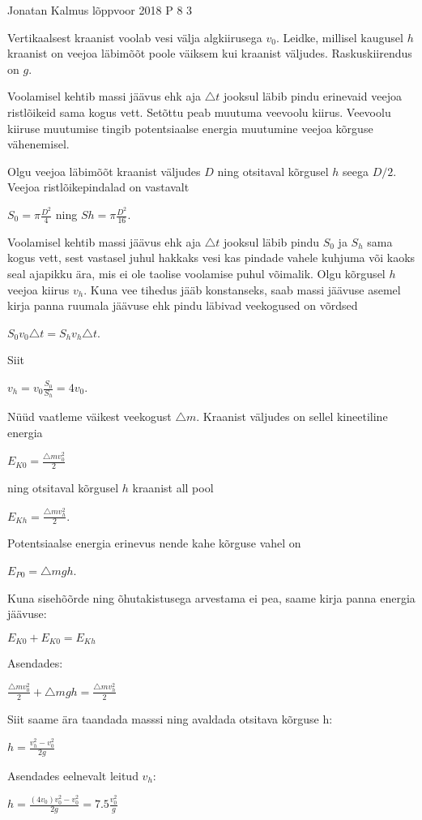 {Jonatan Kalmus} %
{lõppvoor} %
{2018} %
{P 8} %
{3} %
{

\ifStatement
Vertikaalsest kraanist voolab vesi välja algkiirusega $v_0$. Leidke, millisel kaugusel $h$ kraanist on veejoa läbimõõt poole väiksem kui kraanist väljudes. Raskuskiirendus on $g$.
\fi


\ifHint
Voolamisel kehtib massi jäävus ehk aja $\triangle t$ jooksul läbib pindu erinevaid veejoa ristlõikeid sama kogus vett. Setõttu peab muutuma veevoolu kiirus. Veevoolu kiiruse muutumise tingib potentsiaalse energia muutumine veejoa kõrguse vähenemisel.
\fi

\ifSolution
Olgu veejoa läbimõõt kraanist väljudes $D$ ning otsitaval kõrgusel $h$ seega $D/2$. Veejoa ristlõikepindalad on vastavalt 
\begin{center}
$S_0 = \pi \frac{D^2}{4}$ ning $Sh = \pi \frac{D^2}{16}$. 
\end{center}
Voolamisel kehtib massi jäävus ehk aja $\triangle t$ jooksul läbib pindu $S_0$ ja $S_h$ sama kogus vett, sest vastasel juhul hakkaks vesi kas pindade vahele kuhjuma või kaoks seal ajapikku ära, mis ei ole taolise voolamise puhul võimalik. Olgu kõrgusel $h$ veejoa kiirus $v_h$. Kuna vee tihedus jääb konstanseks, saab massi jäävuse asemel kirja panna ruumala jäävuse ehk pindu läbivad veekogused on võrdsed
\begin{center}
$S_0 v_0 \triangle t = S_h v_h \triangle t$. 
\end{center}
Siit 
\begin{center}
$v_h = v_0 \frac{S_0}{S_h} = 4v_0$.
\end{center}
Nüüd vaatleme väikest veekogust $\triangle m $. Kraanist väljudes on sellel kineetiline energia
\begin{center}
$E_{K0} = \frac{\triangle m v_0 ^2}{2}$
\end{center}
ning otsitaval kõrgusel $h$ kraanist all pool
\begin{center}
$E_{Kh} = \frac{\triangle mv_h ^2}{2}$.
\end{center}
Potentsiaalse energia erinevus nende kahe kõrguse vahel on 
\begin{center}
$E_{P0} = \triangle mgh$.
\end{center}
Kuna sisehõõrde ning õhutakistusega arvestama ei pea, saame kirja panna energia jäävuse:
\begin{center}
$E_{K0} + E_{K0} = E_{Kh}$
\end{center}
Asendades:
\begin{center}
$\frac{\triangle mv_0 ^2}{2} + \triangle mgh = \frac{\triangle mv_h ^2}{2}$
\end{center}
Siit saame ära taandada masssi ning avaldada otsitava kõrguse h:
\begin{center}
$h = \frac{v_h ^2 - v_0 ^2}{2g}$
\end{center}
Asendades eelnevalt leitud $v_h$:
\begin{center}
$h = \frac{(4v_0)v_0 ^2 - v_0 ^2}{2g} = 7.5 \frac{ v_0 ^2}{g}$
\end{center}
\fi
}